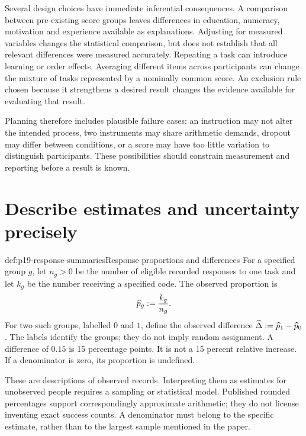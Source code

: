 Several design choices have immediate inferential consequences. A comparison
between pre-existing score groups leaves differences in education, numeracy,
motivation and experience available as explanations. Adjusting for measured
variables changes the statistical comparison, but does not establish that all
relevant differences were measured accurately. Repeating a task can introduce
learning or order effects. Averaging different items across participants can
change the mixture of tasks represented by a nominally common score. An
exclusion rule chosen because it strengthens a desired result changes the
evidence available for evaluating that result.

Planning therefore includes plausible failure cases: an instruction may not
alter the intended process, two instruments may share arithmetic demands,
dropout may differ between conditions, or a score may have too little variation
to distinguish participants. These possibilities should constrain measurement
and reporting before a result is known.

\section{Describe estimates and uncertainty precisely}
\label{sec:p19-estimates-and-uncertainty}

\begin{hbdefinition}{def:p19-response-summaries}{Response proportions and differences}
For a specified group \(g\), let \(n_g>0\) be the number of eligible recorded
responses to one task and let \(k_g\) be the number receiving a specified code.
The observed proportion is
\[
 \widehat p_g\mathrel{:=}\frac{k_g}{n_g}.
\]
For two such groups, labelled \(0\) and \(1\), define the observed difference
\(\widehat\Delta\mathrel{:=}\widehat p_1-\widehat p_0\).
The labels identify the groups; they do not imply random assignment.
A difference of \(0.15\) is 15 percentage points. It is not a 15 percent
relative increase. If a denominator is zero, its proportion is undefined.
\end{hbdefinition}

These are descriptions of observed records. Interpreting them as estimates
for unobserved people requires a sampling or statistical model. Published
rounded percentages support correspondingly approximate arithmetic; they do
not license inventing exact success counts. A denominator must belong to the
specific estimate, rather than to the largest sample mentioned in the paper.


